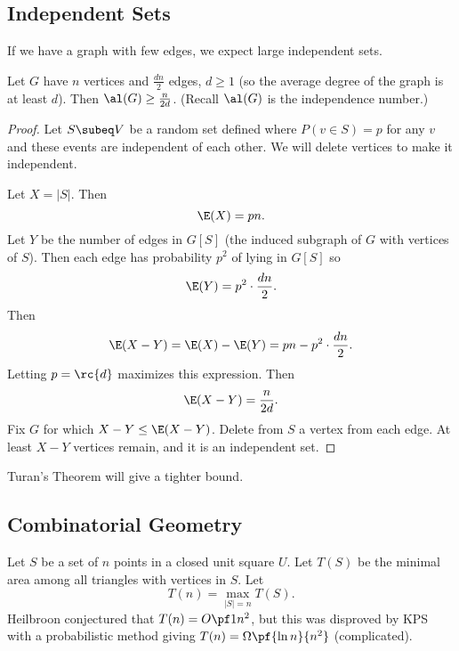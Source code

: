 \subsection{Independent Sets}
If we have a graph with few edges, we expect large independent sets.
\begin{thm}
Let $G$ have $n$ vertices and $\frac{dn}{2}$ edges, $d\geq 1$ (so the average degree of the graph is at least $d$). Then $\al(G)\geq \frac{n}{2d}$. (Recall $\al(G)$ is the independence number.)
\end{thm}
\begin{proof}
Let $S\subeq V$ be a random set defined where
$P(v\in S)=p$ for any $v$ and these events are independent of each other. We will delete vertices to make it independent.

Let $X=|S|$. Then
\[\E(X)=pn.\]
Let $Y$ be the number of edges in $G[S]$ (the induced subgraph of $G$ with vertices of $S$). Then each edge has probability $p^2$ of lying in $G[S]$ so
\[\E(Y)=p^2\cdot \frac{dn}{2}.\]
Then
\[
\E(X-Y)=\E(X)-\E(Y)=pn-p^2\cdot \frac{dn}{2}.
\]
Letting $p=\rc{d}$ maximizes this expression. Then
\[
\E(X-Y)=\frac{n}{2d}.
\]
Fix $G$ for which $X-Y\leq \E(X-Y)$. Delete from $S$ a vertex from each edge. At least $X-Y$ vertices remain, and it is an independent set.
\end{proof}
Turan's Theorem will give a tighter bound.

\subsection{Combinatorial Geometry}
Let $S$ be a set of $n$ points in a closed unit square $U$. Let $T(S)$ be the minimal area among all triangles with vertices in $S$. 
Let
\[T(n)=\max_{|S|=n}T(S).\]
Heilbroon conjectured that $T(n)=O\pf1{n^2}$, but this was disproved by KPS with a probabilistic method giving $T(n)=\Omega\pf{\ln n}{n^2}$ (complicated).

